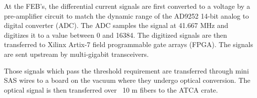At the FEB's, the differential current signals are first converted to a voltage
by a pre-amplifier circuit to match the dynamic range 
of the AD9252 14-bit analog to digital converter (ADC). The ADC samples the 
signal at 41.667 MHz and digitizes it to a value between 0 and 16384.  The 
digitized signals are then transferred to Xilinx Artix-7 field programmable
gate arrays (FPGA).  The signals are sent upstream by multi-gigabit transceivers.

Those signals which pass the threshold requirement are transferred through 
mini SAS wires to a board on the vacuum  where they undergo optical conversion.
The optical signal is then transferred over ~10 m fibers to the ATCA crate.





